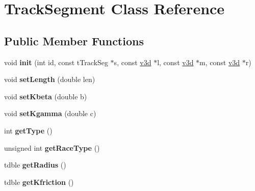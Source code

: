 \hypertarget{class_track_segment}{\section{Track\-Segment Class Reference}
\label{class_track_segment}
}
\subsection*{Public Member Functions}
\begin{DoxyCompactItemize}
\item 
\hypertarget{class_track_segment_a0d7aa771510829e5f9852e94f6126c60}{void {\bfseries init} (int id, const t\-Track\-Seg $\ast$s, const \hyperlink{classv3d}{v3d} $\ast$l, const \hyperlink{classv3d}{v3d} $\ast$m, const \hyperlink{classv3d}{v3d} $\ast$r)}\label{class_track_segment_a0d7aa771510829e5f9852e94f6126c60}

\item 
\hypertarget{class_track_segment_a9f4ac30b9f4f026e22bc672486c1882e}{void {\bfseries set\-Length} (double len)}\label{class_track_segment_a9f4ac30b9f4f026e22bc672486c1882e}

\item 
\hypertarget{class_track_segment_a40c70335ed98872778f919ee76e1bb47}{void {\bfseries set\-Kbeta} (double b)}\label{class_track_segment_a40c70335ed98872778f919ee76e1bb47}

\item 
\hypertarget{class_track_segment_aa57b62621033c8ea12784720473d8687}{void {\bfseries set\-Kgamma} (double c)}\label{class_track_segment_aa57b62621033c8ea12784720473d8687}

\item 
\hypertarget{class_track_segment_a64f3f45c95c9916b3bda32fc9810507b}{int {\bfseries get\-Type} ()}\label{class_track_segment_a64f3f45c95c9916b3bda32fc9810507b}

\item 
\hypertarget{class_track_segment_a72a284c7235deb8a368670280541d9bc}{unsigned int {\bfseries get\-Race\-Type} ()}\label{class_track_segment_a72a284c7235deb8a368670280541d9bc}

\item 
\hypertarget{class_track_segment_af31b1ca53ac073bf0f8fd63d5f8ae7b5}{tdble {\bfseries get\-Radius} ()}\label{class_track_segment_af31b1ca53ac073bf0f8fd63d5f8ae7b5}

\item 
\hypertarget{class_track_segment_a56fab0d94c42e3c0e564d2f56d0e0f79}{tdble {\bfseries get\-Kfriction} ()}\label{class_track_segment_a56fab0d94c42e3c0e564d2f56d0e0f79}


\end{DoxyCompactItemize}
